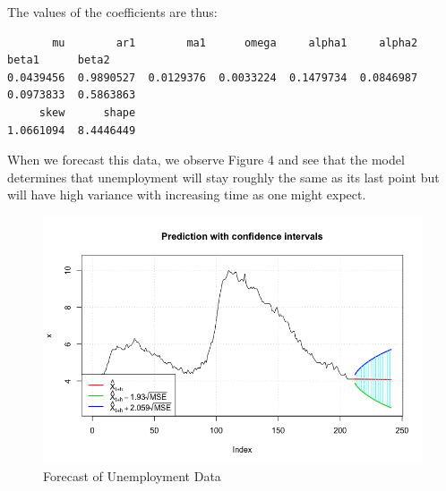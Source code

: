 \documentclass[10pt,a4paper]{article}
\begin{document}
The values of the coefficients are thus:
\begin{verbatim}
       mu        ar1        ma1      omega     alpha1     alpha2      beta1      beta2  
0.0439456  0.9890527  0.0129376  0.0033224  0.1479734  0.0846987  0.0973833  0.5863863  
     skew      shape  
1.0661094  8.4446449 
\end{verbatim}

When we forecast this data, we observe Figure 4 and see that the model determines that unemployment will stay roughly the same as its last point but will have high variance with increasing time as one might expect.

\begin{figure}[h]
\centering
\includegraphics[scale=.5]{Forecast}
\caption{Forecast of Unemployment Data}
\end{figure}
\end{document}

